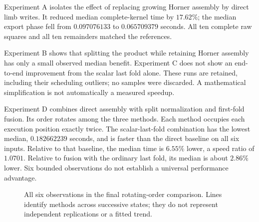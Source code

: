 \documentclass[11pt,a4paper]{article}
\theoremstyle{definition}
\begin{document}
Experiment A isolates the effect of replacing growing Horner assembly by
direct limb writes. It reduced median complete-kernel time by $17.62\%$;
the median export phase fell from $0.097076133$ to $0.065709379$ seconds.
All ten complete raw squares and all ten remainders matched the references.

Experiment B shows that splitting the product while retaining Horner
assembly has only a small observed median benefit. Experiment C does not
show an end-to-end improvement from the scalar last fold alone. These runs
are retained, including their scheduling outliers; no samples were discarded.
A mathematical simplification is not automatically a measured speedup.

Experiment D combines direct assembly with split normalization and first-fold
fusion. Its order rotates among the three methods. Each method occupies
each execution position exactly twice. The scalar-last-fold combination has
the lowest median, $0.182662239$ seconds, and is faster than the direct
baseline on all six inputs. Relative to that baseline, the median time is
$6.55\%$ lower, a speed ratio of $1.0701$. Relative to fusion with the
ordinary last fold, its median is about $2.86\%$ lower. Six bounded
observations do not establish a universal performance advantage.

\begin{figure}[htbp]
\centering
{}
\caption{All six observations in the final rotating-order comparison.
Lines identify methods across successive states; they do not represent
independent replications or a fitted trend.}
\label{fig:paired}
\end{figure}
\end{document}
